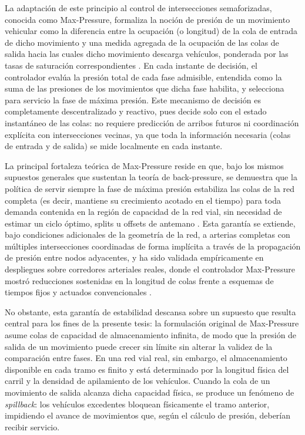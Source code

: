La adaptación de este principio al control de intersecciones semaforizadas, conocida como Max-Pressure, formaliza la noción de presión de un movimiento vehicular como la diferencia entre la ocupación (o longitud) de la cola de entrada de dicho movimiento y una medida agregada de la ocupación de las colas de salida hacia las cuales dicho movimiento descarga vehículos, ponderada por las tasas de saturación correspondientes \cite{varaiya2013max}. En cada instante de decisión, el controlador evalúa la presión total de cada fase admisible, entendida como la suma de las presiones de los movimientos que dicha fase habilita, y selecciona para servicio la fase de máxima presión. Este mecanismo de decisión es completamente descentralizado y reactivo, pues decide solo con el estado instantáneo de las colas: no requiere predicción de arribos futuros ni coordinación explícita con intersecciones vecinas, ya que toda la información necesaria (colas de entrada y de salida) se mide localmente en cada instante.

La principal fortaleza teórica de Max-Pressure reside en que, bajo los mismos supuestos generales que sustentan la teoría de back-pressure, se demuestra que la política de servir siempre la fase de máxima presión estabiliza las colas de la red completa (es decir, mantiene su crecimiento acotado en el tiempo) para toda demanda contenida en la región de capacidad de la red vial, sin necesidad de estimar un ciclo óptimo, splits u offsets de antemano \cite{varaiya2013max}. Esta garantía se extiende, bajo condiciones adicionales de la geometría de la red, a arterias completas con múltiples intersecciones coordinadas de forma implícita a través de la propagación de presión entre nodos adyacentes, y ha sido validada empíricamente en despliegues sobre corredores arteriales reales, donde el controlador Max-Pressure mostró reducciones sostenidas en la longitud de colas frente a esquemas de tiempos fijos y actuados convencionales \cite{kouvelas2014maximum}.

No obstante, esta garantía de estabilidad descansa sobre un supuesto que resulta central para los fines de la presente tesis: la formulación original de Max-Pressure asume colas de capacidad de almacenamiento infinita, de modo que la presión de salida de un movimiento puede crecer sin límite sin alterar la validez de la comparación entre fases. En una red vial real, sin embargo, el almacenamiento disponible en cada tramo es finito y está determinado por la longitud física del carril y la densidad de apilamiento de los vehículos. Cuando la cola de un movimiento de salida alcanza dicha capacidad física, se produce un fenómeno de \emph{spillback}: los vehículos excedentes bloquean físicamente el tramo anterior, impidiendo el avance de movimientos que, según el cálculo de presión, deberían recibir servicio.

